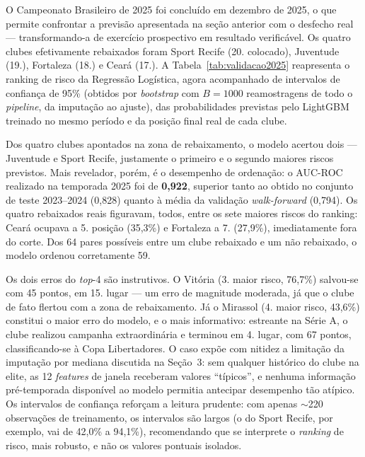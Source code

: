 \documentclass[
    article,
    12pt,
    oneside,
    a4paper,
    english,
    brazilian
    ]{abntex2}
\begin{document}
O Campeonato Brasileiro de 2025 foi concluído em dezembro de 2025, o que permite confrontar a previsão apresentada na seção anterior com o desfecho real --- transformando-a de exercício prospectivo em resultado verificável. Os quatro clubes efetivamente rebaixados foram Sport Recife (20.\textordmasculine{} colocado), Juventude (19.\textordmasculine{}), Fortaleza (18.\textordmasculine{}) e Ceará (17.\textordmasculine{}). A Tabela~\ref{tab:validacao2025} reapresenta o ranking de risco da Regressão Logística, agora acompanhado de intervalos de confiança de 95\% (obtidos por \textit{bootstrap} com $B = 1000$ reamostragens de todo o \textit{pipeline}, da imputação ao ajuste), das probabilidades previstas pelo LightGBM treinado no mesmo período e da posição final real de cada clube.



Dos quatro clubes apontados na zona de rebaixamento, o modelo acertou dois --- Juventude e Sport Recife, justamente o primeiro e o segundo maiores riscos previstos. Mais revelador, porém, é o desempenho de ordenação: o AUC-ROC realizado na temporada 2025 foi de \textbf{0,922}, superior tanto ao obtido no conjunto de teste 2023--2024 (0,828) quanto à média da validação \textit{walk-forward} (0,794). Os quatro rebaixados reais figuravam, todos, entre os sete maiores riscos do ranking: Ceará ocupava a 5.\textordmasculine{} posição (35,3\%) e Fortaleza a 7.\textordmasculine{} (27,9\%), imediatamente fora do corte. Dos 64 pares possíveis entre um clube rebaixado e um não rebaixado, o modelo ordenou corretamente 59.

Os dois erros do \textit{top}-4 são instrutivos. O Vitória (3.\textordmasculine{} maior risco, 76,7\%) salvou-se com 45 pontos, em 15.\textordmasculine{} lugar --- um erro de magnitude moderada, já que o clube de fato flertou com a zona de rebaixamento. Já o Mirassol (4.\textordmasculine{} maior risco, 43,6\%) constitui o maior erro do modelo, e o mais informativo: estreante na Série A, o clube realizou campanha extraordinária e terminou em 4.\textordmasculine{} lugar, com 67 pontos, classificando-se à Copa Libertadores. O caso expõe com nitidez a limitação da imputação por mediana discutida na Seção~3: sem qualquer histórico do clube na elite, as 12 \textit{features} de janela receberam valores ``típicos'', e nenhuma informação pré-temporada disponível ao modelo permitia antecipar desempenho tão atípico. Os intervalos de confiança reforçam a leitura prudente: com apenas $\sim$220 observações de treinamento, os intervalos são largos (o do Sport Recife, por exemplo, vai de 42,0\% a 94,1\%), recomendando que se interprete o \emph{ranking} de risco, mais robusto, e não os valores pontuais isolados.
\end{document}
